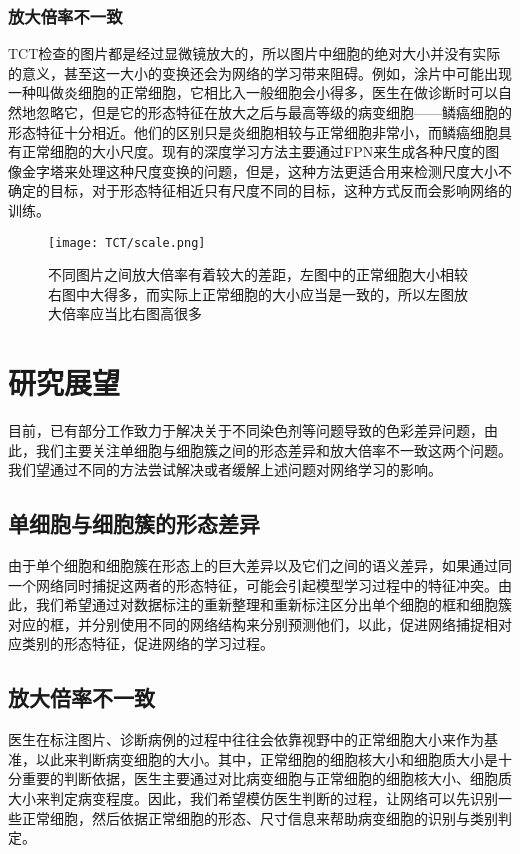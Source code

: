 \subsubsection{放大倍率不一致}
\par TCT检查的图片都是经过显微镜放大的，所以图片中细胞的绝对大小并没有实际的意义，甚至这一大小的变换还会为网络的学习带来阻碍。例如，涂片中可能出现一种叫做炎细胞的正常细胞，它相比入一般细胞会小得多，医生在做诊断时可以自然地忽略它，但是它的形态特征在放大之后与最高等级的病变细胞——鳞癌细胞的形态特征十分相近。他们的区别只是炎细胞相较与正常细胞非常小，而鳞癌细胞具有正常细胞的大小尺度。现有的深度学习方法主要通过FPN来生成各种尺度的图像金字塔来处理这种尺度变换的问题，但是，这种方法更适合用来检测尺度大小不确定的目标，对于形态特征相近只有尺度不同的目标，这种方式反而会影响网络的训练。
\begin{figure}[h]
    \centering
    \texttt{[image: TCT/scale.png]}
    \caption{不同图片之间放大倍率有着较大的差距，左图中的正常细胞大小相较右图中大得多，而实际上正常细胞的大小应当是一致的，所以左图放大倍率应当比右图高很多}
    \label{倍率差异}
\end{figure}
\section{研究展望}
\par 目前，已有部分工作致力于解决关于不同染色剂等问题导致的色彩差异问题，由此，我们主要关注单细胞与细胞簇之间的形态差异和放大倍率不一致这两个问题。我们望通过不同的方法尝试解决或者缓解上述问题对网络学习的影响。

\subsection{单细胞与细胞簇的形态差异}
\par 由于单个细胞和细胞簇在形态上的巨大差异以及它们之间的语义差异，如果通过同一个网络同时捕捉这两者的形态特征，可能会引起模型学习过程中的特征冲突。由此，我们希望通过对数据标注的重新整理和重新标注区分出单个细胞的框和细胞簇对应的框，并分别使用不同的网络结构来分别预测他们，以此，促进网络捕捉相对应类别的形态特征，促进网络的学习过程。

\subsection{放大倍率不一致}
\par 医生在标注图片、诊断病例的过程中往往会依靠视野中的正常细胞大小来作为基准，以此来判断病变细胞的大小。其中，正常细胞的细胞核大小和细胞质大小是十分重要的判断依据，医生主要通过对比病变细胞与正常细胞的细胞核大小、细胞质大小来判定病变程度。因此，我们希望模仿医生判断的过程，让网络可以先识别一些正常细胞，然后依据正常细胞的形态、尺寸信息来帮助病变细胞的识别与类别判定。

\newpage
\begingroup
\linespread{1}
\printbibliography[title={参考文献}]
\endgroup
